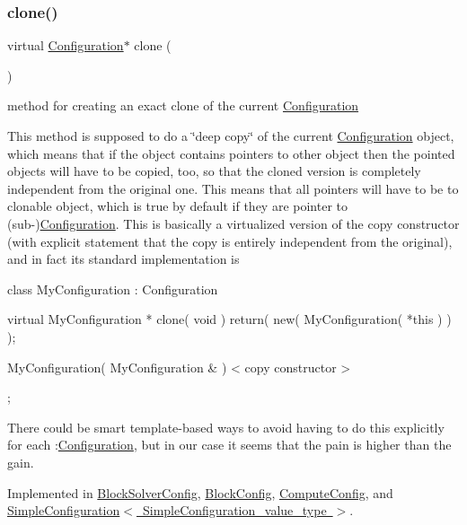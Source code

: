 \subsubsection{\texorpdfstring{clone()}{clone()}}
{\footnotesize\ttfamily virtual \mbox{\hyperlink{class_s_m_spp__di__unipi__it_1_1_configuration}{Configuration}}$\ast$ clone (\begin{DoxyParamCaption}\item[{void}]{ }\end{DoxyParamCaption})\hspace{0.3cm}{\ttfamily [pure virtual]}}



method for creating an exact clone of the current \mbox{\hyperlink{class_s_m_spp__di__unipi__it_1_1_configuration}{Configuration}} 

This method is supposed to do a \char`\"{}deep copy\char`\"{} of the current \mbox{\hyperlink{class_s_m_spp__di__unipi__it_1_1_configuration}{Configuration}} object, which means that if the object contains pointers to other object then the pointed objects will have to be copied, too, so that the cloned version is completely independent from the original one. This means that all pointers will have to be to clonable object, which is true by default if they are pointer to (sub-\/)\mbox{\hyperlink{class_s_m_spp__di__unipi__it_1_1_configuration}{Configuration}}. This is basically a virtualized version of the copy constructor (with explicit statement that the copy is entirely independent from the original), and in fact its standard implementation is \begin{DoxyVerb}class MyConfiguration : Configuration {
 virtual MyConfiguration * clone( void ) {
 return( new( MyConfiguration( *this ) ) );
 }

 MyConfiguration( MyConfiguration & ) { < copy constructor > }
 };
\end{DoxyVerb}


There could be smart template-\/based ways to avoid having to do this explicitly for each \+:\mbox{\hyperlink{class_s_m_spp__di__unipi__it_1_1_configuration}{Configuration}}, but in our case it seems that the pain is higher than the gain. 

Implemented in \mbox{\hyperlink{class_s_m_spp__di__unipi__it_1_1_block_solver_config_a41a9cf4b8ab0ae3454431ec9333a98d5}{Block\+Solver\+Config}}, \mbox{\hyperlink{class_s_m_spp__di__unipi__it_1_1_block_config_aad48f22d1d55c91173132511df58c35b}{Block\+Config}}, \mbox{\hyperlink{class_s_m_spp__di__unipi__it_1_1_compute_config_afab10dc29991f0b9078db7255c5795b3}{Compute\+Config}}, and \mbox{\hyperlink{class_s_m_spp__di__unipi__it_1_1_simple_configuration_a1ea836100a12633cd85e9b8dacd7e01c}{Simple\+Configuration$<$ Simple\+Configuration\+\_\+value\+\_\+type $>$}}.

